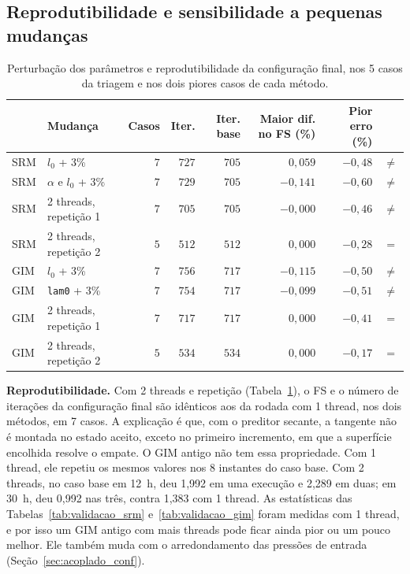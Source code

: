 \documentclass[11pt,a4paper]{article}
\numberwithin{equation}{section}
\begin{document}
\subsection{Reprodutibilidade e sensibilidade a pequenas mudanças}\label{sec:reprodutibilidade}

\begin{table}[htbp]
\centering\small
\caption{Perturbação dos parâmetros e reprodutibilidade da configuração final, nos 5 casos da triagem e nos dois piores casos de cada método.}\label{tab:robustez}
\begin{tabular}{llrrrrrc}
\toprule
 & Mudança & Casos & Iter. & Iter. base & Maior dif. no FS (\%) & Pior erro (\%) &  \\
\midrule
SRM & $l_0$ + 3\% & $7$ & $727$ & $705$ & $0{,}059$ & $-0{,}48$ & $\neq$ \\
SRM & $\alpha$ e $l_0$ + 3\% & $7$ & $729$ & $705$ & $-0{,}141$ & $-0{,}60$ & $\neq$ \\
SRM & 2 threads, repetição 1 & $7$ & $705$ & $705$ & $-0{,}000$ & $-0{,}46$ & $\neq$ \\
SRM & 2 threads, repetição 2 & $5$ & $512$ & $512$ & $0{,}000$ & $-0{,}28$ & $=$ \\
GIM & $l_0$ + 3\% & $7$ & $756$ & $717$ & $-0{,}115$ & $-0{,}50$ & $\neq$ \\
GIM & \texttt{lam0} + 3\% & $7$ & $754$ & $717$ & $-0{,}099$ & $-0{,}51$ & $\neq$ \\
GIM & 2 threads, repetição 1 & $7$ & $717$ & $717$ & $0{,}000$ & $-0{,}41$ & $=$ \\
GIM & 2 threads, repetição 2 & $5$ & $534$ & $534$ & $0{,}000$ & $-0{,}17$ & $=$ \\
\bottomrule
\end{tabular}
\end{table}


\textbf{Reprodutibilidade.} Com 2 threads e repetição (Tabela~\ref{tab:robustez}), o FS e o número de iterações da configuração final são idênticos aos da rodada com 1 thread, nos dois métodos, em 7 casos. A explicação é que, com o preditor secante, a tangente não é montada no estado aceito, exceto no primeiro incremento, em que a superfície encolhida resolve o empate. O GIM antigo não tem essa propriedade. Com 1 thread, ele repetiu os mesmos valores nos 8 instantes do caso base. Com 2 threads, no caso base em 12~h, deu 1,992 em uma execução e 2,289 em duas; em 30~h, deu 0,992 nas três, contra 1,383 com 1 thread. As estatísticas das Tabelas~\ref{tab:validacao_srm} e~\ref{tab:validacao_gim} foram medidas com 1 thread, e por isso um GIM antigo com mais threads pode ficar ainda pior ou um pouco melhor. Ele também muda com o arredondamento das pressões de entrada (Seção~\ref{sec:acoplado_conf}).
\end{document}
